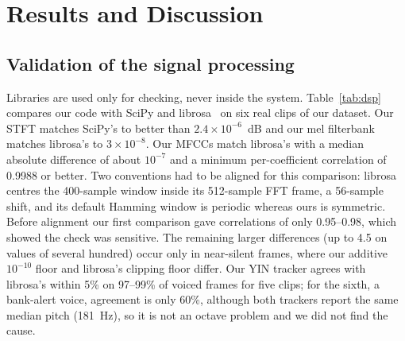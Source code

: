 \documentclass[letterpaper,12pt]{article}
\begin{document}
\section{Results and Discussion}\label{sec:results}
\subsection{Validation of the signal processing}
Libraries are used only for checking, never inside the system. Table~\ref{tab:dsp} compares our code with SciPy and librosa~\cite{mcfee2015librosa} on six real clips of our dataset. Our STFT matches SciPy's to better than $2.4\times10^{-6}$~dB and our mel filterbank matches librosa's to $3\times10^{-8}$. Our MFCCs match librosa's with a median absolute difference of about $10^{-7}$ and a minimum per-coefficient correlation of 0.9988 or better. Two conventions had to be aligned for this comparison: librosa centres the 400-sample window inside its 512-sample FFT frame, a 56-sample shift, and its default Hamming window is periodic whereas ours is symmetric. Before alignment our first comparison gave correlations of only 0.95--0.98, which showed the check was sensitive. The remaining larger differences (up to 4.5 on values of several hundred) occur only in near-silent frames, where our additive $10^{-10}$ floor and librosa's clipping floor differ. Our YIN tracker agrees with librosa's within 5\% on 97--99\% of voiced frames for five clips; for the sixth, a bank-alert voice, agreement is only 60\%, although both trackers report the same median pitch (181~Hz), so it is not an octave problem and we did not find the cause.

\begin{table}[H]
\centering
\caption{Our DSP code against reference libraries on six synthetic-speech clips (C1--C6). STFT against SciPy; MFCC against librosa (aligned, symmetric window); F0 against \texttt{librosa.yin} on the frames our tracker calls voiced.}
\label{tab:dsp}
\resizebox{\textwidth}{!}{\tabdsp}
\end{table}
\end{document}
